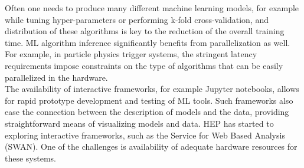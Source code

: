 Often one needs to produce many different machine learning models, for example while tuning hyper-parameters or performing k-fold cross-validation, and distribution of these algorithms is key to the reduction of the overall training time.
ML algorithm inference significantly benefits from parallelization as well. For example, in particle physics trigger systems, the stringent latency requirements impose constraints on the type of algorithms that can be easily parallelized in the hardware.\\

The availability of interactive frameworks, for example Jupyter notebooks, allows for rapid prototype development and testing of ML tools. Such frameworks also ease the connection between the description of models and the data, providing straightforward means of visualizing models and data.
HEP has started to exploring interactive frameworks, such as the Service for Web Based Analysis (SWAN). One of the challenges is availability of adequate hardware resources for these systems.



